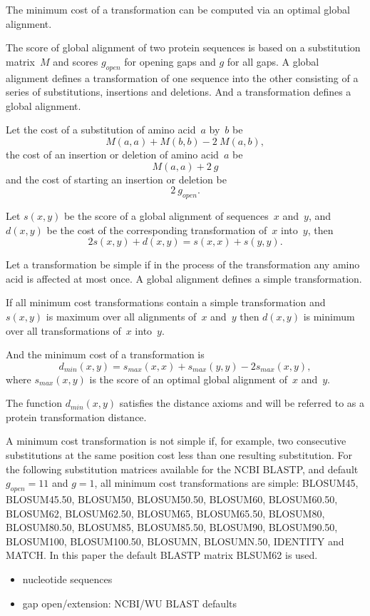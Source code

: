 \documentclass[10pt,a4paper]{article}
\begin{document}
The minimum cost of a transformation can be computed via an optimal global alignment.

The score of global alignment of two protein sequences is based on a substitution matrix~$M$ and scores $g_{open}$ for opening gaps and $g$ for all gaps.
A global alignment defines a transformation of one sequence into the other consisting of a series of substitutions, insertions and deletions.
And a transformation defines a global alignment.

Let the cost of a substitution of amino acid~$a$ by~$b$ be
$$ M(a,a) + M(b,b) - 2 \ M(a,b), $$
the cost of an insertion or deletion of amino acid~$a$ be
$$ M(a,a) + 2 \ g $$
and the cost of starting an insertion or deletion be
$$ 2 \ g_{open}. $$

Let $s(x,y)$ be the score of a global alignment of sequences~$x$ and~$y$, and $d(x,y)$ be the cost of the corresponding transformation of~$x$ into~$y$,
then
$$ 2 s(x,y) + d(x,y) = s(x,x) + s(y,y). $$

Let a transformation be simple if in the process of the transformation any amino acid is affected at most once.
A global alignment defines a simple transformation.

If all minimum cost transformations contain a simple transformation and $s(x,y)$ is maximum over all alignments of~$x$ and~$y$
then $d(x,y)$ is minimum over all transformations of~$x$ into~$y$.

And the minimum cost of a transformation is
$$ d_{min}(x,y) = s_{max}(x,x) + s_{max}(y,y) - 2 s_{max}(x,y), $$
where $s_{max}(x,y)$ is the score of an optimal global alignment of~$x$ and~$y$.

The function $d_{min}(x,y)$ satisfies the distance axioms and will be referred to as a protein transformation distance.

A minimum cost transformation is not simple if, for example, two consecutive substitutions at the same position cost less than one resulting substitution.
For the following substitution matrices available for the NCBI BLASTP, and default $g_{open} = 11$ and $g = 1$,
all minimum cost transformations are simple:
BLOSUM45, BLOSUM45.50, BLOSUM50, BLOSUM50.50, BLOSUM60, BLOSUM60.50, BLOSUM62, BLOSUM62.50, BLOSUM65, BLOSUM65.50, BLOSUM80, BLOSUM80.50, BLOSUM85, BLOSUM85.50,
BLOSUM90, BLOSUM90.50, BLOSUM100, BLOSUM100.50, BLOSUMN, BLOSUMN.50, IDENTITY and MATCH.
In this paper the default BLASTP matrix BLSUM62 is used.

\comm
{
\begin{itemize}
  \item nucleotide sequences
  \item gap open/extension: NCBI/WU BLAST defaults
\end{itemize}
}
\end{document}
